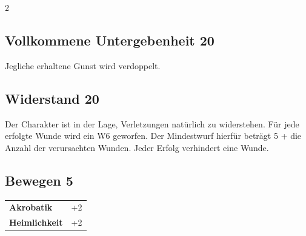 \begin{multicols}{2}
\begin{tcolorbox}
\end{tcolorbox}

\begin{tcolorbox}
    \subsection*{Vollkommene Untergebenheit \hfill \small{20 }}
    \tcblower
Jegliche erhaltene Gunst wird verdoppelt.


\vspace{3mm}



\end{tcolorbox}

\begin{tcolorbox}
    \subsection*{Widerstand \hfill \small{20 }}
    \tcblower
Der Charakter ist in der Lage, Verletzungen natürlich zu widerstehen. Für jede erfolgte Wunde wird ein W6 geworfen. Der Mindestwurf hierfür beträgt 5 + die Anzahl der verursachten Wunden. Jeder Erfolg verhindert eine Wunde.


\vspace{3mm}



\end{tcolorbox}

\begin{tcolorbox}
    \subsection*{Bewegen \hfill \small{5 }}
    \tcblower




\begin{tabular}{@{}ll@{}}
    \textbf{Akrobatik} & +2\\
    \textbf{Heimlichkeit} & +2\\
\end{tabular}



\end{tcolorbox}
\end{multicols}
